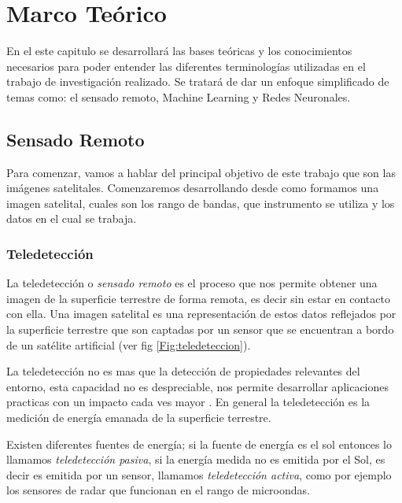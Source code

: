 \chapter{Marco Teórico} \label{chap:marcoteorico}

En el este capitulo se desarrollará las bases teóricas y los conocimientos necesarios para poder entender las diferentes terminologías utilizadas en el trabajo de investigación realizado. Se tratará de dar un enfoque simplificado de temas como: el sensado remoto,  Machine Learning y Redes Neuronales.

\section{Sensado Remoto}\label{sec:sensadoremoto}

Para comenzar, vamos a hablar del principal objetivo de este trabajo que son las imágenes satelitales. Comenzaremos desarrollando desde como formamos una imagen satelital, cuales son los rango de bandas, que instrumento se utiliza y los datos en el cual se trabaja.

\subsection{Teledetección}\label{sub:teledeteccion}

La teledetección o \textit{sensado remoto} es el proceso que nos permite obtener una imagen de la superficie terrestre de forma remota, es decir sin estar en contacto con ella. Una imagen satelital es una representación de estos datos reflejados por la superficie terrestre que son captadas por un sensor que se encuentran a bordo de un satélite artificial (ver fig \ref{Fig:teledeteccion}).

La teledetección no es mas que la detección de propiedades relevantes del entorno, esta capacidad no es despreciable, nos permite desarrollar aplicaciones practicas con un impacto cada ves mayor \citep{percepcion}. En general la teledetección es la medición de energía emanada de la superficie terrestre. 

Existen diferentes fuentes de energía; si la fuente de energía es el sol entonces lo llamamos \textit{teledetección pasiva}, si la energía medida no es emitida por el Sol, es decir es emitida por un sensor, llamamos \textit{teledetección activa}, como por ejemplo los sensores de radar que funcionan en el rango de microondas.

